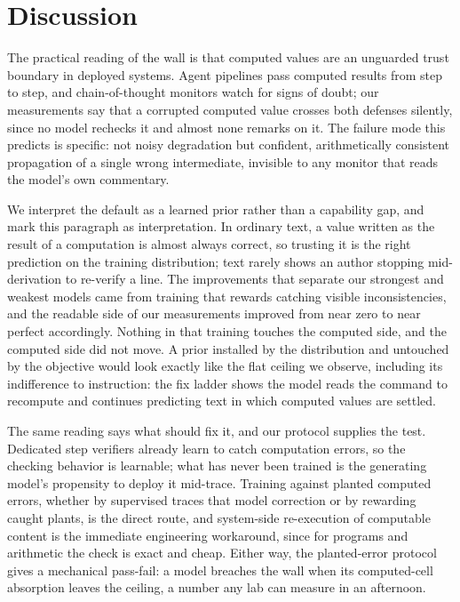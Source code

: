 \section{Discussion}
\label{sec:discussion}

The practical reading of the wall is that computed values are an unguarded trust boundary in deployed systems. Agent pipelines pass computed results from step to step, and chain-of-thought monitors watch for signs of doubt; our measurements say that a corrupted computed value crosses both defenses silently, since no model rechecks it and almost none remarks on it. The failure mode this predicts is specific: not noisy degradation but confident, arithmetically consistent propagation of a single wrong intermediate, invisible to any monitor that reads the model's own commentary.

We interpret the default as a learned prior rather than a capability gap, and mark this paragraph as interpretation. In ordinary text, a value written as the result of a computation is almost always correct, so trusting it is the right prediction on the training distribution; text rarely shows an author stopping mid-derivation to re-verify a line. The improvements that separate our strongest and weakest models came from training that rewards catching visible inconsistencies, and the readable side of our measurements improved from near zero to near perfect accordingly. Nothing in that training touches the computed side, and the computed side did not move. A prior installed by the distribution and untouched by the objective would look exactly like the flat ceiling we observe, including its indifference to instruction: the fix ladder shows the model reads the command to recompute and continues predicting text in which computed values are settled.

The same reading says what should fix it, and our protocol supplies the test. Dedicated step verifiers already learn to catch computation errors, so the checking behavior is learnable; what has never been trained is the generating model's propensity to deploy it mid-trace. Training against planted computed errors, whether by supervised traces that model correction or by rewarding caught plants, is the direct route, and system-side re-execution of computable content is the immediate engineering workaround, since for programs and arithmetic the check is exact and cheap. Either way, the planted-error protocol gives a mechanical pass-fail: a model breaches the wall when its computed-cell absorption leaves the ceiling, a number any lab can measure in an afternoon.

